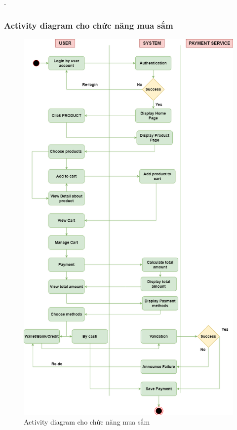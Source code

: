 \begin {list} {-}{}
\subsubsection{Activity diagram cho chức năng mua sắm}
\begin{figure}[h]
    \centering
    \includegraphics[scale=0.4]{images/hieu/chap-3/shopping-activity-diagram.png}
    \caption{Activity diagram cho chức năng mua sắm}
\end{figure}
\newpage

\end{list}
